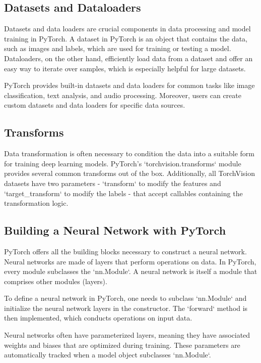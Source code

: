 \subsection{Datasets and Dataloaders}

Datasets and data loaders are crucial components in data processing and model training in PyTorch. A dataset in PyTorch is an object that contains the data, such as images and labels, which are used for training or testing a model. Dataloaders, on the other hand, efficiently load data from a dataset and offer an easy way to iterate over samples, which is especially helpful for large datasets.

PyTorch provides built-in datasets and data loaders for common tasks like image classification, text analysis, and audio processing. Moreover, users can create custom datasets and data loaders for specific data sources.

\subsection{Transforms}

Data transformation is often necessary to condition the data into a suitable form for training deep learning models. PyTorch's `torchvision.transforms` module provides several common transforms out of the box. Additionally, all TorchVision datasets have two parameters - `transform` to modify the features and `target\_transform` to modify the labels - that accept callables containing the transformation logic.

\subsection{Building a Neural Network with PyTorch}

PyTorch offers all the building blocks necessary to construct a neural network. Neural networks are made of layers that perform operations on data. In PyTorch, every module subclasses the `nn.Module`. A neural network is itself a module that comprises other modules (layers). 

To define a neural network in PyTorch, one needs to subclass `nn.Module` and initialize the neural network layers in the constructor. The `forward` method is then implemented, which conducts operations on input data.

Neural networks often have parameterized layers, meaning they have associated weights and biases that are optimized during training. These parameters are automatically tracked when a model object subclasses `nn.Module`.

